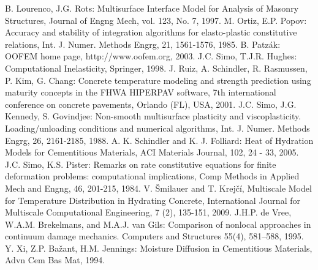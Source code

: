 \documentclass[a4paper]{article}
\begin{document}
\begin{thebibliography}{99}
 B. Lourenco, J.G. Rots: Multisurface Interface Model for Analysis of Masonry Structures, Journal of Engng Mech, vol. 123, No. 7, 1997.
 M. Ortiz, E.P. Popov: Accuracy and stability of integration algorithms for elasto-plastic constitutive relations, Int. J. Numer. Methods Engrg, 21, 1561-1576, 1985.
 B. Patz\'ak: OOFEM home page, http://www.oofem.org, 2003.
 J.C. Simo, T.J.R. Hughes: Computational Inelasticity, Springer, 1998.
 J. Ruiz, A. Schindler, R. Rasmussen, P. Kim, G. Chang: Concrete temperature modeling and strength prediction using maturity concepts in the FHWA HIPERPAV software, 7th international conference on concrete pavements, Orlando (FL), USA, 2001.
 J.C. Simo, J.G. Kennedy, S. Govindjee: Non-smooth multisurface plasticity and viscoplasticity. Loading/unloading conditions and numerical algorithms, Int. J. Numer. Methods Engrg, 26, 2161-2185, 1988.
 A. K. Schindler and K. J. Folliard: Heat of Hydration Models for Cementitious Materials, ACI Materials Journal, 102, 24 - 33, 2005.
 J.C. Simo, K.S. Pister: Remarks on rate constitutive equations for finite deformation problems: computational implications, Comp Methods in Applied Mech and Engng, 46, 201-215, 1984.
 V. \v{S}milauer and T. Krej\v{c}\'i, Multiscale
  Model for Temperature Distribution in Hydrating Concrete,
  International Journal for Multiscale Computational Engineering, 7
  (2), 135-151, 2009.
 J.H.P. de Vree, W.A.M. Brekelmans, and M.A.J. van Gils: Comparison of nonlocal approaches in continuum damage mechanics. Computers and Structures 55(4), 581–588, 1995.
 Y. Xi, Z.P. Ba\v{z}ant, H.M. Jennings: Moisture Diffusion
  in Cementitious Materials, Advn Cem Bas Mat, 1994.
\end{thebibliography}
\end{document}
